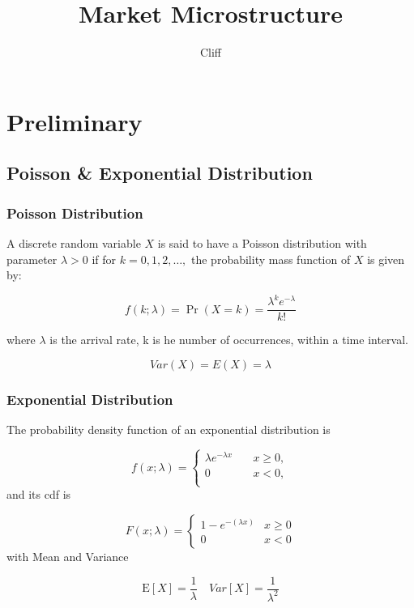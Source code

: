 \documentclass[a4]{article}
\title{Market Microstructure}
\author{Cliff}
\begin{document}
\tableofcontents
\newpage
\maketitle
\section{Preliminary}
\subsection{Poisson \& Exponential Distribution}
\subsubsection{Poisson Distribution}
A discrete random variable $X$ is said to have a Poisson distribution with parameter
$\lambda>0$ if for $k=0,1,2, \ldots,$ the probability mass function of $X$ is given by:\par 
$$
f(k ; \lambda)=\operatorname{Pr}(X=k)=\frac{\lambda^{k} e^{-\lambda}}{k !}
$$\par 
where $\lambda $ is the arrival rate, k is he number of occurrences, within a time interval.\par 
$$
Var(X) = E(X) = \lambda 
$$ 
\subsubsection{Exponential Distribution}
The probability density function of an exponential distribution is \par 
$$
f(x;\lambda) = \left\{ \begin{aligned}
\lambda e^{-\lambda x}\quad &x\geq 0,\\
0\quad &x<0,\\
\end{aligned}\right.
$$
and its cdf is \par 
$$
F(x ; \lambda)=\left\{\begin{array}{ll}
1-e^{-(\lambda x)} & x \geq 0 \\
0 & x<0
\end{array}\right.
$$
with Mean and Variance\par 
$$
\mathrm{E}[X]=\frac{1}{\lambda}\quad Var[X] =\dfrac{1}{\lambda ^{2}}
$$
\end{document}
